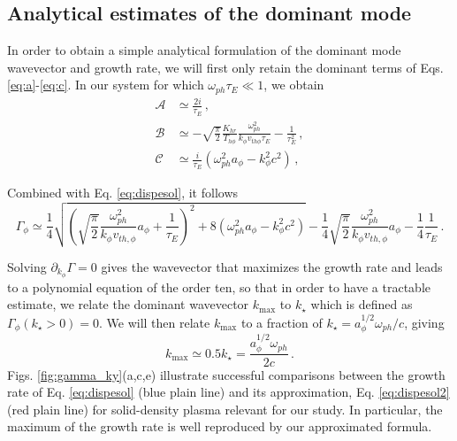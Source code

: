 \documentclass[aps,showpacs,superscriptaddress]{revtex4}
\begin{document}
\subsection{Analytical estimates of the dominant mode}

In order to obtain a simple analytical formulation of the dominant mode wavevector and growth rate, we will first only retain the dominant terms of Eqs. \eqref{eq:a}-\eqref{eq:c}. In our system for which $\omega_{ph} \tau_E \ll 1$, we obtain
\begin{align}
\mathcal{A} & \simeq \frac{2i}{\tau_E}  \label{eq:a2} \, , \\
\mathcal{B} & \simeq    - \sqrt{\frac{\pi}{2}}\frac{K_{hr} }{T_{h\phi}}\frac{\omega_{ph}^2}{k_\phi v_{th\phi} \tau_E}
 -\frac{1}{\tau_E^2 }  \, , \label{eq:b2} \\
\mathcal{C} & \simeq \frac{i}{\tau_E}(\omega_{ph}^2 a_\phi -k_\phi^2c^2 )\label{eq:c2}\, , 
\end{align}

Combined with Eq. \eqref{eq:dispesol}, it follows
\begin{equation}
\Gamma_\phi  \simeq \frac{1}{4}  \sqrt{ \left( \sqrt{\frac{\pi}{2}} \frac{\omega_{ph}^2}{k_\phi v_{th,\phi}}a_\phi    + \frac{1}{\tau_E} \right)^2 +  8(\omega_{ph}^2 a_\phi  - k_\phi^2 c^2 )   }  -\frac{1}{4}   \sqrt{\frac{\pi}{2}} \frac{\omega_{ph}^2}{k_\phi v_{th,\phi}}a_\phi    -\frac{1}{4}   \frac{1}{\tau_E}
\label{eq:dispesol2}\, .
\end{equation}

 Solving $\partial_{k_\phi} \Gamma = 0 $ gives the wavevector that maximizes the growth rate and leads to a polynomial equation of the order ten, so that in order to have a tractable estimate, we relate the dominant wavevector $k_\mathrm{max}$ to $k_\star$ which is defined as $\Gamma_\phi (k_\star>0)=0$. We will then relate $k_\mathrm{max}$ to a fraction of $k_\star =  a_\phi^{1/2}\omega_{ph}/c$, giving 
\begin{equation}\label{eq:ksat}
k_\mathrm{max} \simeq 0.5 k_\star = \frac{a_\phi^{1/2}\omega_{ph}}{2c} \, .
\end{equation}
Figs. \ref{fig:gamma_ky}(a,c,e)  illustrate successful comparisons between the growth rate of Eq. \eqref{eq:dispesol} (blue plain line) and its approximation, Eq. \eqref{eq:dispesol2}  (red plain line) for  solid-density plasma relevant for our study. In particular, the maximum of the growth rate is well reproduced by our approximated formula.
\end{document}
